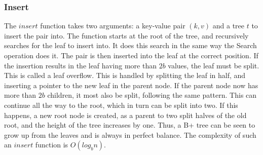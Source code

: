 \subsubsection{Insert}
The $insert$ function takes two arguments: a key-value pair $(k, v)$ and a tree $t$ to insert the pair into. The function starts at the root of the tree, and recursively searches for the leaf to insert into. It does this search in the same way the Search operation does it. The pair is then inserted into the leaf at the correct position. If the insertion results in the leaf having more than $2b$ values, the leaf must be split. This is called a leaf overflow. This is handled by splitting the leaf in half, and inserting a pointer to the new leaf in the parent node. If the parent node now has more than $2b$ children, it most also be split, following the same pattern. This can continue all the way to the root, which in turn can be split into two. If this happens, a new root node is created, as a parent to two split halves of the old root, and the height of the tree increases by one. Thus, a B+ tree can be seen to grow up from the leaves and is always in perfect balance. The complexity of such an $insert$ function is $O(log_b n)$.
